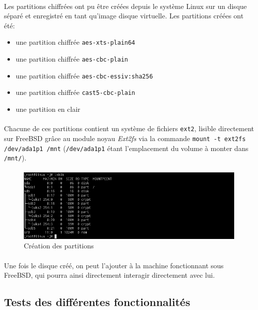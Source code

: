 \paragraph{}
Les partitions chiffrées ont pu être créées depuis le système Linux sur un
disque séparé et enregistré en tant qu'image disque virtuelle. Les partitions
créées ont été:
\begin{itemize}
\item une partition chiffrée \texttt{aes-xts-plain64}
\item une partition chiffrée \texttt{aes-cbc-plain}
\item une partition chiffrée \texttt{aes-cbc-essiv:sha256}
\item une partition chiffrée \texttt{cast5-cbc-plain}
\item une partition en clair
\end{itemize}
\paragraph{}
Chacune de ces partitions contient un système de fichiers \texttt{ext2}, lisible
directement sur FreeBSD grâce au module noyau \textit{Ext2fs} via la commande
\texttt{mount -t ext2fs /dev/ada1p1 /mnt} (\texttt{/dev/ada1p1} étant
l'emplacement du volume à monter dans \texttt{/mnt/}).
\paragraph{}
\begin{figure}[h]
\centering
\includegraphics[width=.9\linewidth]{tests/linux_partitions.png}
\caption{\label{fig:linux_partitions}Création des partitions}
\end{figure}

\paragraph{}
Une fois le disque créé, on peut l'ajouter à la machine fonctionnant sous
FreeBSD, qui pourra ainsi directement interagir directement avec lui.

\subsection{Tests des différentes fonctionnalités}

